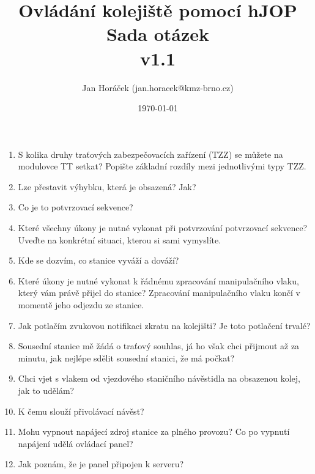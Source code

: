 \documentclass[12pt,a4paper]{article}
\begin{document}
\thispagestyle{empty}
\noindent

\title{
\Large Ovládání kolejiště pomocí hJOP\\
\LARGE Sada otázek\\
\small v1.1}
\author{Jan Horáček (jan.horacek@kmz-brno.cz)}
\date{\today}
\maketitle

\begin{enumerate}
	\item S kolika druhy traťových zabezpečovacích zařízení (TZZ) se můžete na modulovce TT setkat? Popište základní rozdíly mezi jednotlivými typy TZZ.
	
	\item Lze přestavit výhybku, která je obsazená? Jak?
	
	\item Co je to potvrzovací sekvence?
	
	\item Které všechny úkony je nutné vykonat při potvrzování potvrzovací sekvence? Uveďte na konkrétní situaci, kterou si sami vymyslíte.
	
	\item Kde se dozvím, co stanice vyváží a dováží?
	
	\item Které úkony je nutné vykonat k řádnému zpracování manipulačního vlaku, který vám právě přijel do stanice? Zpracování manipulačního vlaku končí v momentě jeho odjezdu ze stanice.
	
	\item Jak potlačím zvukovou notifikaci zkratu na kolejišti? Je toto potlačení trvalé?
	
	\item Sousední stanice mě žádá o traťový souhlas, já ho však chci přijmout až za minutu, jak nejlépe sdělit sousední stanici, že má počkat?
	
	\item Chci vjet s vlakem od vjezdového staničního návěstidla na obsazenou kolej, jak to udělám?
	
	\item K čemu slouží přivolávací návěst?
	
	\item Mohu vypnout napájecí zdroj stanice za plného provozu? Co po vypnutí napájení udělá ovládací panel?
	
	\item Jak poznám, že je panel připojen k serveru?
	

\end{enumerate}
\end{document}
